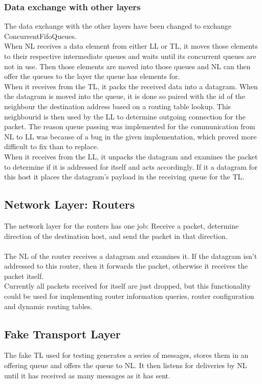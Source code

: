 \subsubsection{Data exchange with other layers}
The data exchange with the other layers have been changed to exchange ConcurrentFifoQueues.\\
When NL receives a data element from either LL or TL, it moves those elements to their respective intermediate queues and waits until its concurrent queues are not in use. Then those elements are moved into those queues and NL can then offer the queues to the layer the queue has elements for.\\
When it receives from the TL, it packs the received data into a datagram. When the datagram is moved into the queue, it is done so paired with the id of the neighbour the destination address based on a routing table lookup. This neighbourid is then used by the LL to determine outgoing connection for the packet. The reason queue passing was implemented for the communication from NL to LL was because of a bug in the given implementation, which proved more difficult to fix than to replace.\\
When it receives from the LL, it unpacks the datagram and examines the packet to determine if it is addressed for itself and acts accordingly. If it a datagram for this host it places the datagram's payload in the receiving queue for the TL.\\

\subsection{Network Layer: Routers}
The network layer for the routers has one job: Receive a packet, determine direction of the destination host, and send the packet in that direction.\\
\\
The NL of the router receives a datagram and examines it. If the datagram isn't addressed to this router, then it forwards the packet, otherwise it receives the packet itself.\\
Currently all packets received for itself are just dropped, but this functionality could be used for implementing router information queries, router configuration and dynamic routing tables.

\subsection{Fake Transport Layer}
The fake TL used for testing generates a series of messages, stores them in an offering queue and offers the queue to NL. It then listens for deliveries by NL until it has received as many messages as it has sent.





